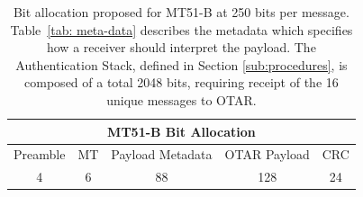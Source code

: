 \documentclass[letterpaper,times]{IONconf/IONconf}
\begin{document}
		\begin{table}%
			\center
			\begin{tabular}{|c|c|c|c|c|} \hline
				\multicolumn{5}{|c|}{MT51-B Bit Allocation} \\ \hline
				Preamble & MT & Payload Metadata & OTAR Payload & CRC \\ \hline
				4 & 6 & 88 & 128 & 24 \\ \hline
			\end{tabular}
			\caption{
				Bit allocation proposed for MT51-B at 250 bits per message. 
				Table~\ref{tab: meta-data} describes the metadata which specifies how a receiver should interpret the payload.
				The Authentication Stack, defined in Section \ref{sub:procedures}, is composed of a total 2048 bits, requiring receipt of the 16 unique messages to OTAR.
			}
			\label{tab: mt51-b}
		\end{table}
\end{document}
